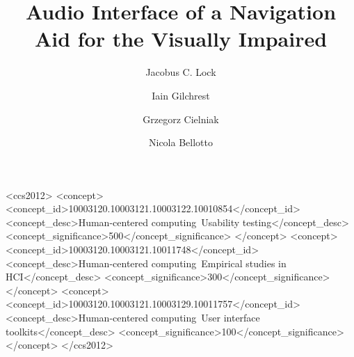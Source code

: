 \documentclass[format=sigconf, review=true, screen=true, anonymous=true]{acmart}
\begin{document}

\title[Audio Interface for the Visually Impaired]{Audio Interface of a Navigation Aid for the Visually Impaired}

\author{Jacobus C. Lock}

\author{Iain Gilchrest}

\author{Grzegorz Cielniak}

\author{Nicola Bellotto}




 \begin{CCSXML}
<ccs2012>
<concept>
<concept_id>10003120.10003121.10003122.10010854</concept_id>
<concept_desc>Human-centered computing~Usability testing</concept_desc>
<concept_significance>500</concept_significance>
</concept>
<concept>
<concept_id>10003120.10003121.10011748</concept_id>
<concept_desc>Human-centered computing~Empirical studies in HCI</concept_desc>
<concept_significance>300</concept_significance>
</concept>
<concept>
<concept_id>10003120.10003121.10003129.10011757</concept_id>
<concept_desc>Human-centered computing~User interface toolkits</concept_desc>
<concept_significance>100</concept_significance>
</concept>
</ccs2012>
\end{CCSXML}
\end{document}
